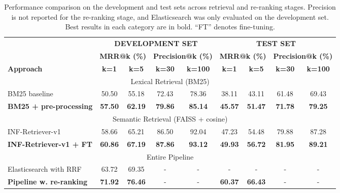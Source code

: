 \begin{table}
  \caption{Performance comparison on the development and test sets across retrieval and re-ranking stages. Precision is not reported for the re-ranking stage, and Elasticsearch was only evaluated on the development set. Best results in each category are in bold. ``FT'' denotes fine-tuning.}
  \label{tab:performance_dev}
  \begin{tabular}{lcc|cc|cc|cc}
    \toprule
     & \multicolumn{4}{c}{\textbf{DEVELOPMENT SET}} & \multicolumn{4}{c}{\textbf{TEST SET}}\\
     \cmidrule(lr){2-5} \cmidrule(lr){6-9}
     & \multicolumn{2}{c}{\textbf{MRR@k (\%)}} & \multicolumn{2}{c}{\textbf{Precision@k (\%)}\phantom{m}}
     & \multicolumn{2}{c}{\phantom{m}\textbf{MRR@k (\%)}} & \multicolumn{2}{c}{\textbf{Precision@k (\%)}}\\
     \cmidrule(lr){2-3} \cmidrule(lr){4-5} \cmidrule(lr){6-7} \cmidrule(lr){8-9}
      \textbf{Approach} & \textbf{k=1} & \textbf{k=5} & \textbf{k=30} & \textbf{k=100}& \textbf{k=1} & \textbf{k=5} & \textbf{k=30} & \textbf{k=100} \\
    \midrule
    \multicolumn{9}{c}{Lexical Retrieval (BM25)} \\
    \midrule
    BM25 baseline & 50.50 & 55.18 & 72.43 & 78.36 & 38.11 & 43.11 & 61.48 & 69.43\\
    \textbf{BM25 + pre-processing} & \textbf{57.50} & \textbf{62.19} & \textbf{79.86} & \textbf{85.14}  & \textbf{45.57} & \textbf{51.47} & \textbf{71.78} & \textbf{79.25}\\
    \midrule
    \multicolumn{9}{c}{Semantic Retrieval (FAISS + cosine)} \\
    \midrule
    INF-Retriever-v1 & 58.66 & 65.21 & 86.50 & 92.04  & 47.23 & 54.48 & 79.88 & 87.28\\
    \textbf{INF-Retriever-v1 + FT} & \textbf{60.86} & \textbf{67.19} & \textbf{87.86} & \textbf{93.12}  & \textbf{49.93} & \textbf{56.72} & \textbf{81.95} & \textbf{89.21}\\
    \midrule
    \multicolumn{9}{c}{Entire Pipeline} \\
    \midrule
    Elasticsearch with RRF & 63.72 & 69.35 & - & -  & - & - & - & -\\
    \textbf{Pipeline w. re-ranking} & \textbf{71.92} & \textbf{76.46} & - & -  & \textbf{60.37} & \textbf{66.43} & - & -\\
    \bottomrule
  \end{tabular}
\end{table}


